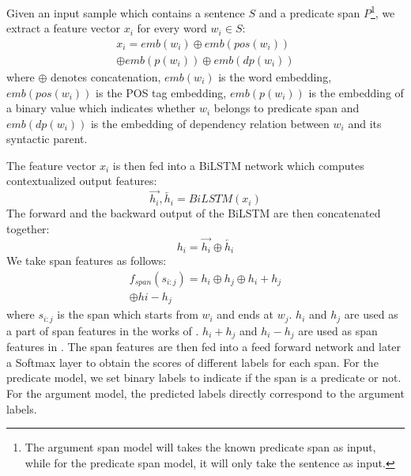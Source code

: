 \documentclass[letterpaper]{article} %
\begin{document}
Given an input sample which contains a sentence $S$ and a predicate span $P$\footnote{The argument span model will takes the known predicate span as input, while for the predicate span model, it will only take the sentence as input.}, we extract a feature vector $x_i$ for every word $w_i \in S $:
\begin{equation}
    \begin{split}
        x_i=emb(w_i) \oplus emb(pos(w_i))
        \\ \oplus  emb(p(w_i)) \oplus emb(dp(w_i))
    \end{split}
\end{equation}
where $\oplus$ denotes concatenation, $emb(w_i)$ is the word embedding, $emb(pos(w_i))$ is the POS tag embedding, $emb(p(w_i))$ is the embedding of a binary value which indicates whether $w_i$ belongs to predicate span and $emb(dp(w_i))$ is the embedding of dependency relation between $w_i$ and its syntactic parent.

The feature vector $x_i$ is then fed into a BiLSTM network which computes contextualized output features:
\begin{equation}
    \overrightarrow{h_i},\overleftarrow{h_i} = BiLSTM(x_i)
\end{equation}
The forward and the backward output of the BiLSTM are then concatenated together:
\begin{equation}
    h_i = \overrightarrow{h_i}\oplus\overleftarrow{h_i}
\end{equation}
We take span features as follows:
\begin{equation}\label{span_feature}
    \begin{split}
        f_{span}(s_{i:j}) = h_i \oplus h_j \oplus h_i + h_j\\
         \oplus hi - h_j 
    \end{split}
\end{equation}
where $s_{i:j}$ is the span which starts from $w_i$ and ends at $w_j$. $h_i$ and $h_j$ are used as a part of span features in the works of \cite{He2018JointlyPP}. $h_i+h_j$ and $h_i-h_j$ are used as span features in \cite{Ouchi2018ASS}. The span features are then fed into a feed forward network and later a Softmax layer to obtain the scores of different labels for each span. For the predicate model, we set binary labels to indicate if the span is a predicate or not. For the argument model, the predicted labels directly correspond to the argument labels. 
\end{document}

